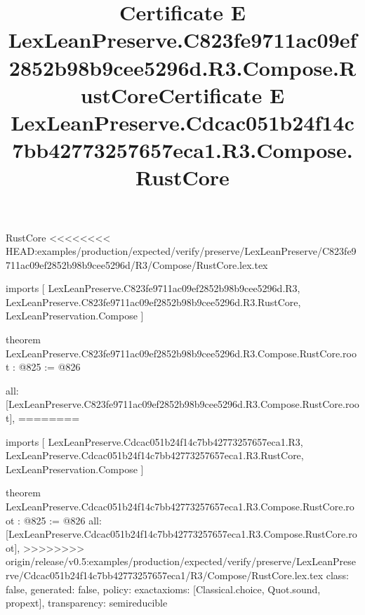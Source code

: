 \begin{lexlean}{RustCore}
<<<<<<<< HEAD:examples/production/expected/verify/preserve/LexLeanPreserve/C823fe9711ac09ef2852b98b9cee5296d/R3/Compose/RustCore.lex.tex
\title{Certificate E LexLeanPreserve.C823fe9711ac09ef2852b98b9cee5296d.R3.Compose.RustCore}
\begin{coremodule}
imports [
  LexLeanPreserve.C823fe9711ac09ef2852b98b9cee5296d.R3,
  LexLeanPreserve.C823fe9711ac09ef2852b98b9cee5296d.R3.RustCore,
  LexLeanPreservation.Compose
]

theorem LexLeanPreserve.C823fe9711ac09ef2852b98b9cee5296d.R3.Compose.RustCore.root : @825 := @826 {
  all: [LexLeanPreserve.C823fe9711ac09ef2852b98b9cee5296d.R3.Compose.RustCore.root],
========
\title{Certificate E LexLeanPreserve.Cdcac051b24f14c7bb42773257657eca1.R3.Compose.RustCore}
\begin{coremodule}
imports [
  LexLeanPreserve.Cdcac051b24f14c7bb42773257657eca1.R3,
  LexLeanPreserve.Cdcac051b24f14c7bb42773257657eca1.R3.RustCore,
  LexLeanPreservation.Compose
]

theorem LexLeanPreserve.Cdcac051b24f14c7bb42773257657eca1.R3.Compose.RustCore.root : @825 := @826 {
  all: [LexLeanPreserve.Cdcac051b24f14c7bb42773257657eca1.R3.Compose.RustCore.root],
>>>>>>>> origin/release/v0.5:examples/production/expected/verify/preserve/LexLeanPreserve/Cdcac051b24f14c7bb42773257657eca1/R3/Compose/RustCore.lex.tex
  class: false,
  generated: false,
  policy: exact{axioms: [Classical.choice, Quot.sound, propext]},
  transparency: semireducible
}


\end{coremodule}}
\end{coremodule}
\end{lexlean}
